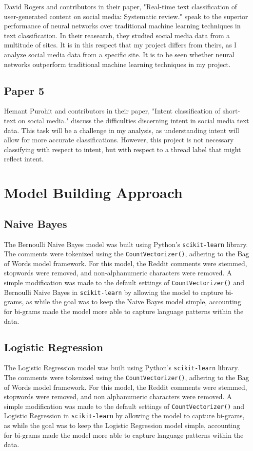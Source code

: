 \documentclass[twocolumn]{article}
\begin{document}
David Rogers and contributors in their paper, "Real-time text classification of user-generated content on social media: Systematic review." speak to the superior performance of neural networks over traditional machine learning techniques in text classification. In their reasearch, they studied social media data from a multitude of sites. It is in this respect that my project differs from theirs, as I analyze social media data from a specific site. It is to be seen whether neural networks outperform traditional machine learning techniques in my project.

\subsection{Paper 5}

Hemant Purohit and contributors in their paper, "Intent classification of short-text on social media." discuss the difficulties discerning intent in social media text data. This task will be a challenge in my analysis, as understanding intent will allow for more accurate classifications. However, this project is not necessary classifying with respect to intent, but with respect to a thread label that might reflect intent.

\section{Model Building Approach}
\subsection{Naive Bayes}
The Bernoulli Naive Bayes model was built using Python's \texttt{scikit-learn} library. The comments were tokenized using the \texttt{CountVectorizer()}, adhering to the Bag of Words model framework. For this model, the Reddit comments were stemmed, stopwords were removed, and non-alphanumeric characters were removed. A simple modification was made to the default settings of \texttt{CountVectorizer()} and Bernoulli Naive Bayes in \texttt{scikit-learn} by allowing the model to capture bi-grams, as while the goal was to keep the Naive Bayes model simple, accounting for bi-grams made the model more able to capture language patterns within the data.

\subsection{Logistic Regression}
The Logistic Regression model was built using Python's \texttt{scikit-learn} library. The comments were tokenized using the \texttt{CountVectorizer()}, adhering to the Bag of Words model framework. For this model, the Reddit comments were stemmed, stopwords were removed, and non alphanumeric characters were removed. A simple modification was made to the default settings of \texttt{CountVectorizer()} and Logistic Regression in \texttt{scikit-learn} by allowing the model to capture bi-grams, as while the goal was to keep the Logistic Regression model simple, accounting for bi-grams made the model more able to capture language patterns within the data.
\end{document}
